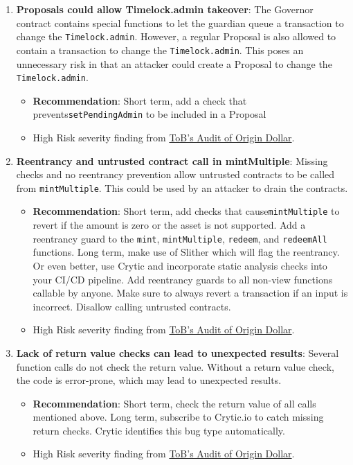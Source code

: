 \begin{enumerate}
\item\textbf{Proposals could allow Timelock.admin takeover}: The Governor contract contains special functions to let the guardian queue a transaction to change the \verb|Timelock.admin|. However, a regular Proposal is also allowed to contain a transaction to change the \verb|Timelock.admin|. This poses an unnecessary risk in that an attacker could create a Proposal to change the \verb|Timelock.admin|.
	\begin{itemize}
	\item\textbf{Recommendation}: Short term, add a check that prevents\linebreak\verb|setPendingAdmin| to be included in a Proposal
	\item High Risk severity finding from \href{https://github.com/trailofbits/publications/blob/master/reviews/OriginDollar.pdf}{ToB’s Audit of Origin Dollar}.
	\end{itemize}

\item\textbf{Reentrancy and untrusted contract call in mintMultiple}: Missing checks and no reentrancy prevention allow untrusted contracts to be called from \verb|mintMultiple|. This could be used by an attacker to drain the contracts.
	\begin{itemize}
	\item\textbf{Recommendation}: Short term, add checks that cause\linebreak\verb|mintMultiple| to revert if the amount is zero or the asset is not supported. Add a reentrancy guard to the \verb|mint|, \verb|mintMultiple|, \verb|redeem|, and \verb|redeemAll| functions. Long term, make use of Slither which will flag the reentrancy. Or even better, use Crytic and incorporate static analysis checks into your CI/CD pipeline. Add reentrancy guards to all non-view functions callable by anyone. Make sure to always revert a transaction if an input is incorrect. Disallow calling untrusted contracts.
	\item High Risk severity finding from \href{https://github.com/trailofbits/publications/blob/master/reviews/OriginDollar.pdf}{ToB’s Audit of Origin Dollar}.
	\end{itemize}

\item\textbf{Lack of return value checks can lead to unexpected results}: Several function calls do not check the return value. Without a return value check, the code is error-prone, which may lead to unexpected results.
	\begin{itemize}
	\item\textbf{Recommendation}: Short term, check the return value of all calls mentioned above. Long term, subscribe to Crytic.io to catch missing return checks. Crytic identifies this bug type automatically.
	\item High Risk severity finding from \href{https://github.com/trailofbits/publications/blob/master/reviews/OriginDollar.pdf}{ToB’s Audit of Origin Dollar}.
	\end{itemize}


\end{enumerate}
